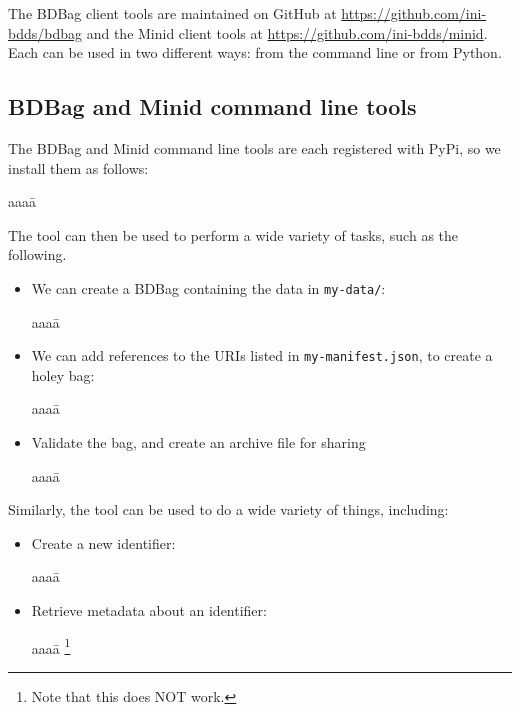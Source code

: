 \documentclass[11pt]{article}
\begin{document}
The BDBag client tools are maintained on GitHub at \url{https://github.com/ini-bdds/bdbag} and the 
Minid client tools at \url{https://github.com/ini-bdds/minid}.
Each can be used in two different ways: from the command line or from Python.

\subsection{BDBag and Minid command line tools} 

The BDBag and Minid command line tools are each registered with PyPi, 
so we install them as follows:
\vspace{-1ex}
\begin{tabbing}
aaaa\=\kill
\>\\
\>
\end{tabbing}

\noindent
The  tool can then be used to perform a wide variety of tasks, such as the following.
\begin{itemize}
\item
We can create a BDBag containing the data in \texttt{my-data/}:
\vspace{-2ex}
\begin{tabbing}
aaaa\=\kill
\>
\end{tabbing}

\item
We can add references to the URIs listed in \texttt{my-manifest.json}, to create a holey bag:
\vspace{-2ex}
\begin{tabbing}
aaaa\=\kill
\>
\end{tabbing}

\item
Validate the bag, and create an archive file for sharing
\vspace{-2ex}
\begin{tabbing}
aaaa\=\kill
\>
\end{tabbing}

\end{itemize}

\noindent
Similarly, the  tool can be used to do a wide variety of things, including:

\begin{itemize}
\item
Create a new identifier:
\vspace{-2ex}
\begin{tabbing}
aaaa\=\kill
\>
\end{tabbing}

\item
Retrieve metadata about an identifier:
\vspace{-2ex}
\begin{tabbing}
aaaa\=\kill
\>\footnote{Note that this does NOT work.}
\end{tabbing}
\end{itemize}
 
\end{document}
